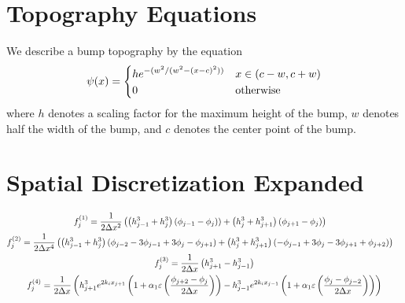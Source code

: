 \section{Topography Equations} \label{sec:topography}

We describe a bump topography by the equation 
\begin{equation*}
    \psi\!\left( x \right) = \begin{dcases}
        he^{-(w^2 / (w^2 - (x - c)^2))} & x \in \left( c-w, c+w \right)\\
        0 & \text{otherwise}
    \end{dcases}
\end{equation*}
where $h$ denotes a scaling factor for the maximum height of the bump, $w$ denotes half 
the width of the bump, and $c$ denotes the center point of the bump. 

\section{Spatial Discretization Expanded}\label{sec:space_discrete_expand}

\begin{gather*}
\begin{aligned}
    f_j^{(1)} %
    &= \frac{1}{2\Delta x^2} \lrp{\lrp{h_{j-1}^3 + h_{j}^3}\lrp{\phi_{j-1} - \phi_{j})} + \lrp{h_{j}^3 + h_{j+1}^3}\lrp{\phi_{j+1} - \phi_{j}}}
\end{aligned}\\
\begin{aligned}
    f_j^{(2)} %
    &= \frac{1}{2\Delta x^4} \lrp{\lrp{h_{j-1}^3 + h_{j}^3} \lrp{\phi_{j-2} - 3\phi_{j-1} + 3\phi_{j} - \phi_{j+1}} + \lrp{h_{j}^3 + h_{j+1}^3} \lrp{-\phi_{j-1} + 3\phi_{j} - 3\phi_{j+1} + \phi_{j+2}}}
\end{aligned}\\
\begin{aligned}
    f_j^{(3)} = \frac{1}{2\Delta x} \lrp{h_{j+1}^3 - h_{j-1}^3}
\end{aligned}\\
\begin{aligned}
    f_j^{(4)} = \frac{1}{2\Delta x} \lrp{h_{j+1}^3 e^{2k_i x_{j+1}} \lrp{1 + \alpha_1 \varepsilon \lrp{\frac{\phi_{j+2} - \phi_{j}}{2\Delta x}}} - h_{j-1}^3 e^{2k_i x_{j-1}} \lrp{1 + \alpha_1 \varepsilon \lrp{\frac{\phi_{j} - \phi_{j-2}}{2\Delta x}}} }
\end{aligned}
\end{gather*}
